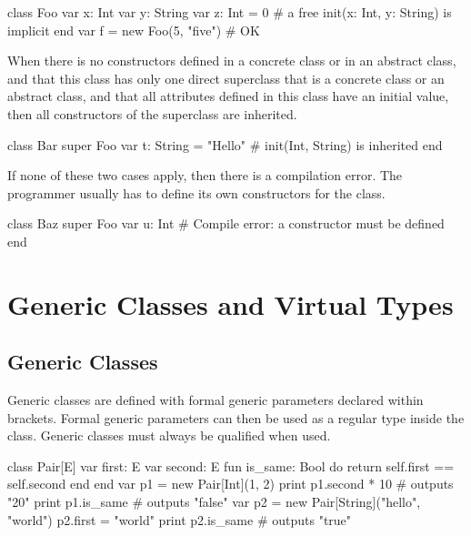 \begin{lst}
class Foo
	var x: Int
	var y: String
	var z: Int = 0
	# a free init(x: Int, y: String) is implicit
end
var f = new Foo(5, "five") # OK
\end{lst}

When there is no constructors defined in a concrete class or in an abstract class, and that this class has only one direct superclass that is a concrete class or an abstract class, and that all attributes defined in this class have an initial value, then all constructors of the superclass are inherited.

\begin{lst}
class Bar
	super Foo
	var t: String = "Hello"
	# init(Int, String) is inherited
end
\end{lst}

If none of these two cases apply, then there is a compilation error.
The programmer usually has to define its own constructors for the class.

\begin{lst}
class Baz
	super Foo
	var u: Int
	# Compile error: a constructor must be defined
end
\end{lst}

\section{Generic Classes and Virtual Types}

\subsection{Generic Classes}\label{generic}

Generic classes are defined with formal generic parameters declared within brackets.
Formal generic parameters can then be used as a regular type inside the class.
Generic classes must always be qualified when used.

\begin{lst}
class Pair[E]
	var first: E
	var second: E
	fun is_same: Bool
	do
		return self.first == self.second
	end
end
var p1 = new Pair[Int](1, 2)
print p1.second * 10 # outputs "20"
print p1.is_same # outputs "false"
var p2 = new Pair[String]("hello", "world")
p2.first = "world"
print p2.is_same # outputs "true"
\end{lst}

